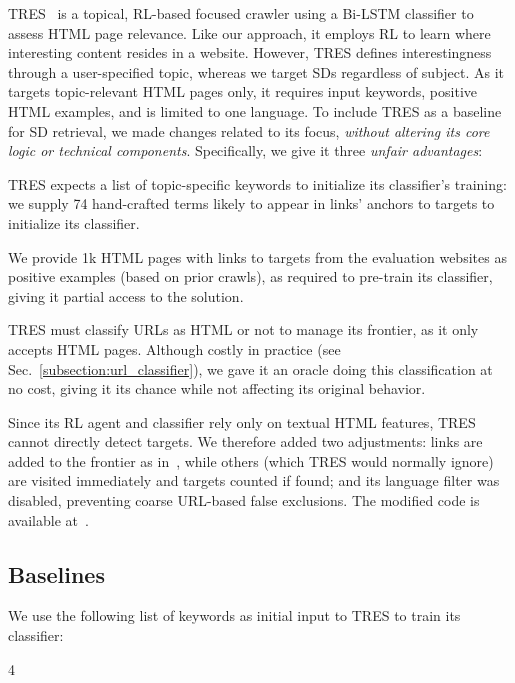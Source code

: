 {\textsf{\small TRES}}~\cite{kontogiannis2022tree} is a topical, RL-based focused crawler using a Bi-LSTM classifier to assess HTML page relevance. Like our approach, it employs RL to learn where interesting content resides in a website. However, {\textsf{\small TRES}} defines interestingness through a user-specified topic, whereas we target SDs regardless of subject. As it targets topic-relevant HTML pages only, it requires input keywords, positive HTML examples, and is limited to one language.
To include {\textsf{\small TRES}} as a baseline for SD retrieval, we made changes related to its focus, \emph{without altering its core logic or technical components}. Specifically, we give it three \emph{unfair advantages}: \begin{inparaenum}[(i)]
\item \textsf{\small TRES} expects a list of topic-specific keywords to initialize its classifier's training: we supply 74 hand-crafted terms likely to appear in links' anchors to targets to initialize its classifier.  
\item We provide 1k HTML pages with links to targets from the evaluation websites as positive examples (based on prior crawls), as required to pre-train its classifier, giving it partial access to the solution.  
\item \textsf{\small TRES} must classify URLs as HTML or not to manage its frontier, as it only accepts HTML pages. Although costly in practice (see Sec.~\ref{subsection:url_classifier}), we gave it an oracle doing this classification at no cost, giving it its chance while not affecting its original behavior.
\end{inparaenum}
Since its RL agent and classifier rely only on textual HTML features, {\textsf{\small TRES}} cannot directly detect targets. We therefore added two adjustments: links are added to the frontier as in~\cite{kontogiannis2022tree}, while others (which TRES would normally ignore) are visited immediately and targets counted if found; and its language filter was disabled, preventing coarse URL-based false exclusions. The modified code is available at~\cite{tres_modified_repository}.

\begin{toappendix}
  \subsection{Baselines}
    We use the following list of keywords as initial input to
  \textsf{\small TRES} to train its classifier:
    \begin{multicols}{4}
      \noindent
      
    \end{multicols}
  
\end{toappendix}
